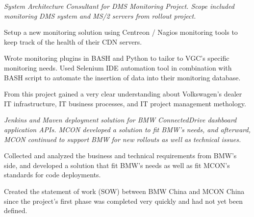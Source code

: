 \documentclass[a4paper]{deedy-resume-proximanova-sanfran} %
\begin{document}
\begin{minipage}[t]{0.66\textwidth}
\emph{System Architecture Consultant for DMS Monitoring Project. Scope included monitoring DMS system and MS/2 servers from rollout project.}
\begin{tightitemize}
\item Setup a new monitoring solution using Centreon / Nagios monitoring tools to keep track of the health of their CDN servers.
\item Wrote monitoring plugins in BASH and Python to tailor to VGC's specific monitoring needs. Used Selenium IDE automation tool in combination with BASH script to automate the insertion of data into their monitoring database.
\item From this project gained a very clear understanding about Volkswagen's dealer IT infrastructure, IT business processes, and IT project management methology.
\end{tightitemize}


\sectionspace %

\emph{Jenkins and Maven deployment solution for BMW ConnectedDrive dashboard application APIs. MCON developed a solution to fit BMW's needs, and afterward, MCON continued to support BMW for new rollouts as well as technical issues.}
\begin{tightitemize}
\item Collected and analyzed the business and technical requirements from BMW's side, and developed a solution that fit BMW's needs as well as fit MCON's standards for code deployments.
\item Created the statement of work (SOW) between BMW China and MCON China since the project's first phase was completed very quickly and had not yet been defined.
\end{tightitemize}


\end{minipage}
\end{document}
